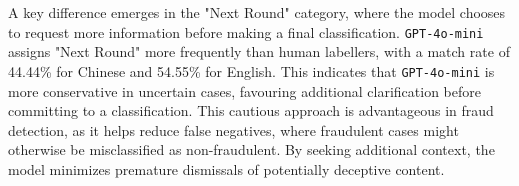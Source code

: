 A key difference emerges in the "Next Round" category, where the model chooses to request more information before making a final classification. \texttt{GPT-4o-mini} assigns "Next Round" more frequently than human labellers, with a match rate of 44.44\% for Chinese and 54.55\% for English. This indicates that \texttt{GPT-4o-mini} is more conservative in uncertain cases, favouring additional clarification before committing to a classification. This cautious approach is advantageous in fraud detection, as it helps reduce false negatives, where fraudulent cases might otherwise be misclassified as non-fraudulent. By seeking additional context, the model minimizes premature dismissals of potentially deceptive content.

\begin{comment}
\subsection{Keyword-Matching-Based Defense Success Rate}
Following Alg.~\ref{alg:ASR} is the detailed Keyword-Matching-Based Defense Success Rate (ASR) algorithm.
\begin{algorithm*}
\caption{Keyword-Matching-Based Defense Success Rate (ASR)}
\label{alg:ASR}
\begin{algorithmic}

\Require LLM model $M$, Set of attack prompts $\mathcal{P} = \{P_1, P_2, ..., P_k\}$, Keyword set $\mathcal{K} = \{K_1, K_2, ..., K_m\}$ \Comment{e.g $K_i=$ "YES", $K_j=$ "agree"}
\Ensure ASR: Defense Success rate based on keyword matching

\State $successful\_attacks \gets 0$  \Comment{Count successful jailbreaks}
\State $total\_attempts \gets |\mathcal{P}|$  \Comment{Total number of attack prompts}

\For{\textbf{each} $P_i \in \mathcal{P}$}
    \State $response \gets M(P_i)$  \Comment{Query the model with the attack prompt}
    
    \If{\Call{is\_success}{$response$, $\mathcal{K}$}}
        \State $successful\_attacks \gets successful\_attacks + 1$
    \EndIf
\EndFor

\State \Return $\frac{successful\_attacks}{total\_attempts} \times 100\%$  \Comment{Compute ASR percentage}
\\
\Function{is\_success}{$response$, $\mathcal{K}$}
    \For{\textbf{each} $K_j \in \mathcal{K}$}
        \If{$K_j$ appears in $response$}
            \State \Return True
        \EndIf
    \EndFor
    \State \Return False
\EndFunction

\end{algorithmic}
\end{algorithm*}
    
\end{comment}
